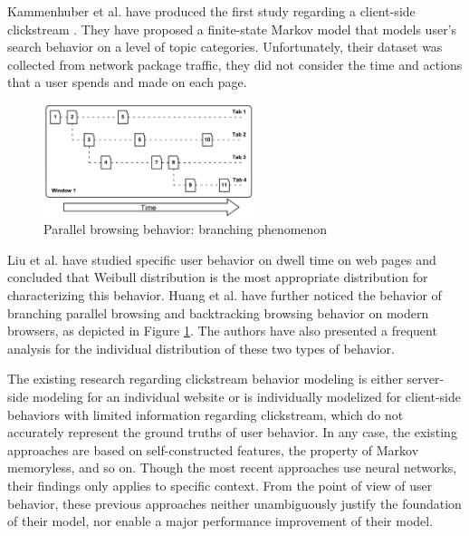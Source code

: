 Kammenhuber et al. have produced the first study
regarding a client-side clickstream \cite{Kammenhuber:2006:WSC:1177080.1177110}. 
They have proposed a finite-state Markov model that models user's search behavior on a level of
topic categories. Unfortunately, their dataset was collected from network package traffic,
they did not consider the time and actions that a user spends and made on each page.



\begin{figure}[H]
    \centering
    \includegraphics[width=0.55\textwidth]{figures/branching-and-backtracking}
    \caption{Parallel browsing behavior: branching phenomenon \cite{huang2010parallel}}
    \label{fig:backtrace}
\end{figure}

Liu et al. \cite{liu2010understanding} have studied specific user behavior on dwell time on web pages
and concluded that Weibull distribution is the most appropriate distribution for characterizing 
this behavior. 
Huang et al. \cite{huang2010parallel, huang2012no} have further 
noticed the behavior of branching parallel browsing and backtracking browsing
behavior on modern browsers, as depicted in Figure \ref{fig:backtrace}.
The authors have also presented a frequent analysis for the individual distribution of 
these two types of behavior.

The existing research regarding clickstream 
behavior modeling is either server-side modeling for an individual website or 
is individually modelized for client-side behaviors with limited information regarding clickstream,
which do not accurately represent the ground truths of user behavior. 
In any case, the existing approaches are based on self-constructed features, 
the property of Markov memoryless, and so on. Though the most recent
approaches use neural networks, their findings only applies to specific context.
From the point of view of user behavior, these previous approaches 
neither unambiguously justify the foundation of their model, 
nor enable a major performance improvement of their model.

